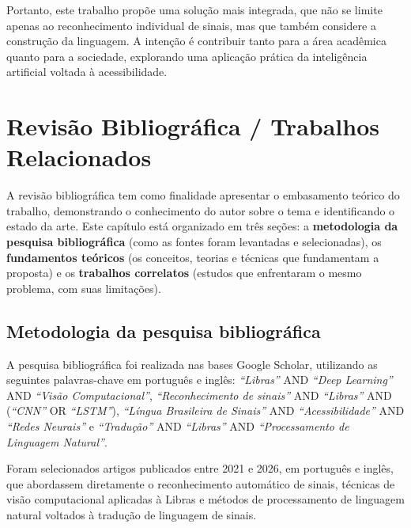 \documentclass[
    12pt,                %
    openright,           %
    oneside,             %
    a4paper,             %
    english,             %
    brazil               %
]{abntex2}
\begin{document}
Portanto, este trabalho propõe uma solução mais integrada, que não se limite apenas ao reconhecimento individual de sinais, mas que também considere a construção da linguagem. A intenção é contribuir tanto para a área acadêmica quanto para a sociedade, explorando uma aplicação prática da inteligência artificial voltada à acessibilidade.

\chapter{Revisão Bibliográfica / Trabalhos Relacionados}
\label{cap:revisao}

A revisão bibliográfica tem como finalidade apresentar o embasamento teórico do trabalho, demonstrando o conhecimento do autor sobre o tema e identificando o estado da arte. Este capítulo está organizado em três seções: a \textbf{metodologia da pesquisa bibliográfica} (como as fontes foram levantadas e selecionadas), os \textbf{fundamentos teóricos} (os conceitos, teorias e técnicas que fundamentam a proposta) e os \textbf{trabalhos correlatos} (estudos que enfrentaram o mesmo problema, com suas limitações).

\section{Metodologia da pesquisa bibliográfica}
\label{sec:metodologia_pesquisa_bib}

A pesquisa bibliográfica foi realizada nas bases Google Scholar, utilizando as seguintes palavras-chave em português e inglês: \textit{``Libras''} AND \textit{``Deep Learning''} AND \textit{``Visão Computacional''}, \textit{``Reconhecimento de sinais''} AND \textit{``Libras''} AND (\textit{``CNN''} OR \textit{``LSTM''}), \textit{``Língua Brasileira de Sinais''} AND \textit{``Acessibilidade''} AND \textit{``Redes Neurais''} e \textit{``Tradução''} AND \textit{``Libras''} AND \textit{``Processamento de Linguagem Natural''}.

Foram selecionados artigos publicados entre 2021 e 2026, em português e inglês, que abordassem diretamente o reconhecimento automático de sinais, técnicas de visão computacional aplicadas à Libras e métodos de processamento de linguagem natural voltados à tradução de linguagem de sinais.
\end{document}
